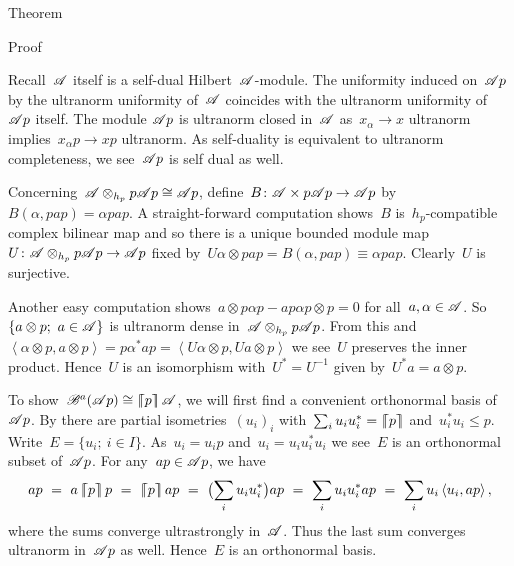 \documentclass[b]{subfiles}
\begin{document}
\begin{parsec}
\begin{point}{Theorem}
\begin{point}{Proof}
\begin{point}
Recall~$\mathscr{A}$ itself is a self-dual Hilbert~$\mathscr{A}$-module.
The uniformity induced on~$\mathscr{A} p$ by the ultranorm uniformity
    of~$\mathscr{A}$ coincides with the ultranorm uniformity of~$\mathscr{A} p$ itself.
The module $\mathscr{A} p$ is ultranorm closed in~$\mathscr{A}$
    as~$x_\alpha \to x$ ultranorm
    implies~$x_\alpha p \to xp$ ultranorm.
As self-duality is equivalent to ultranorm completeness,
    we see~$\mathscr{A} p$ is self dual as well.
\end{point}
\begin{point}%
Concerning~$\mathscr{A} \otimes_{h_p} p \mathscr{A} p \cong \mathscr{A} p$,
    define~$B\colon \mathscr{A} \times  p \mathscr{A} p \to \mathscr{A} p$
    by~$B(\alpha, pap) = \alpha pap$.
A straight-forward computation
    shows~$B$ is~$h_p$-compatible complex bilinear map
    and so there is a unique bounded module
    map~$U \colon \mathscr{A} \otimes_{h_p} p \mathscr{A} p \to \mathscr{A} p$
   fixed by~$U \alpha \otimes pap = B(\alpha,pap) \equiv \alpha pap $.
   Clearly~$U$ is surjective.

Another easy computation shows~$a \otimes p\alpha p - ap\alpha p \otimes p = 0$
    for all~$a, \alpha \in \mathscr{A}$.
So~$\{a \otimes p;\ a\in \mathscr{A}\}$
    is ultranorm dense in~$\mathscr{A} \otimes_{h_p} p \mathscr{A} p$.
From this and
    $\left<\alpha \otimes p, a\otimes p\right> = 
        p \alpha^* a p
        =\left< U \alpha \otimes p, U a \otimes p\right> $
        we see~$U$ preserves the inner product.
Hence~$U$ is an isomorphism with~$U^* = U^{-1}$
    given by~$U^* a = a\otimes p$.
\end{point}
\begin{point}%
To show~$\mathscr{B}^a(\mathscr{A} p) \cong \left\lceil\!\!\left\lceil p\right\rceil\!\!\right\rceil\mathscr{A}$,
we will first find a convenient orthonormal basis of~$\mathscr{A} p$.
By 
    there are partial isometries~$(u_i)_i$
    with~$\sum_i u_iu_i^* = \left\lceil\!\!\left\lceil p\right\rceil\!\!\right\rceil$
    and~$u_i^*u_i \leq p$.
Write~$E = \{u_i; \ i \in I\}$.
As~$u_i = u_i p$ and~$u_i= u_i u_i^* u_i$
    we see~$E$ is an orthonormal subset of~$\mathscr{A} p$.
For any~$ap \in \mathscr{A} p$, we have
\begin{equation*}
    ap \ =\  a \cceil{p} p
       \ =\  \cceil{p} a p
       \ = \ \bigl(\sum_i u_i u_i^*\bigr) ap
       \ = \ \sum_i u_i u_i^* ap
       \ = \ \sum_i u_i \left<u_i,ap\right>,
\end{equation*}
where the sums converge ultrastrongly in~$\mathscr{A}$.
Thus the last sum converges ultranorm in~$\mathscr{A} p$ as well.
Hence~$E$ is an orthonormal basis.


\end{point}
\end{point}
\end{point}
\end{parsec}
\end{document}
